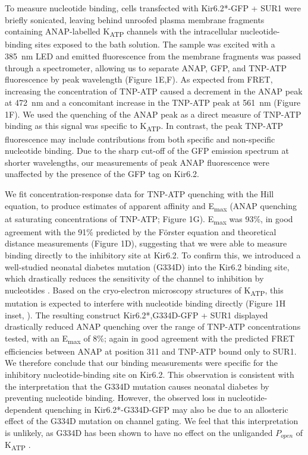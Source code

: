 \documentclass[10pt,lineno, doublespacing]{elife_modified}
\begin{document}
To measure nucleotide binding, cells transfected with Kir6.2*-GFP + SUR1 were briefly sonicated, leaving behind unroofed plasma membrane fragments \citep{RN21, RN22, RN80} containing ANAP-labelled K\textsubscript{ATP} channels with the intracellular nucleotide-binding sites exposed to the bath solution.
The sample was excited with a \SI{385}{\nano\metre} LED and emitted fluorescence from the membrane fragments was passed through a spectrometer, allowing us to separate ANAP, GFP, and TNP-ATP fluorescence by peak wavelength (Figure 1E,F).
As expected from FRET, increasing the concentration of TNP-ATP caused a decrement in the ANAP peak at \SI{472}{\nano\metre} and a concomitant increase in the TNP-ATP peak at \SI{561}{\nano\metre} (Figure 1F).
We used the quenching of the ANAP peak as a direct measure of TNP-ATP binding as this signal was specific to K\textsubscript{ATP}.
In contrast, the peak TNP-ATP fluorescence may include contributions from both specific and non-specific nucleotide binding.
Due to the sharp cut-off of the GFP emission spectrum at shorter wavelengths, our measurements of peak ANAP fluorescence were unaffected by the presence of the GFP tag on Kir6.2.

We fit concentration-response data for TNP-ATP quenching with the Hill equation, to produce estimates of apparent affinity and E\textsubscript{max} (ANAP quenching at saturating concentrations of TNP-ATP; Figure 1G).
E\textsubscript{max} was 93\%, in good agreement with the 91\% predicted by the Förster equation and theoretical distance measurements (Figure 1D), suggesting that we were able to measure binding directly to the inhibitory site at Kir6.2.
To confirm this, we introduced a well-studied neonatal diabetes mutation (G334D) into the Kir6.2 binding site, which drastically reduces the sensitivity of the channel to inhibition by nucleotides \citep{RN27, RN88, RN28}.
Based on the cryo-electron microscopy structures of K\textsubscript{ATP}, this mutation is expected to interfere with nucleotide binding directly (Figure 1H inset, \cite{RN6}).
The resulting construct Kir6.2*,G334D-GFP + SUR1 displayed drastically reduced ANAP quenching over the range of TNP-ATP concentrations tested, with an E\textsubscript{max} of 8\%; again in good agreement with the predicted FRET efficiencies between ANAP at position 311 and TNP-ATP bound only to SUR1.
We therefore conclude that our binding measurements were specific for the inhibitory nucleotide-binding site on Kir6.2.
This observation is consistent with the interpretation that the G334D mutation causes neonatal diabetes by preventing nucleotide binding.
However, the observed loss in nucleotide-dependent quenching in Kir6.2*-G334D-GFP may also be due to an allosteric effect of the G334D mutation on channel gating.
We feel that this interpretation is unlikely, as G334D has been shown to have no effect on the unliganded $P_{open}$ of K\textsubscript{ATP} \citep{RN28}.
\end{document}
